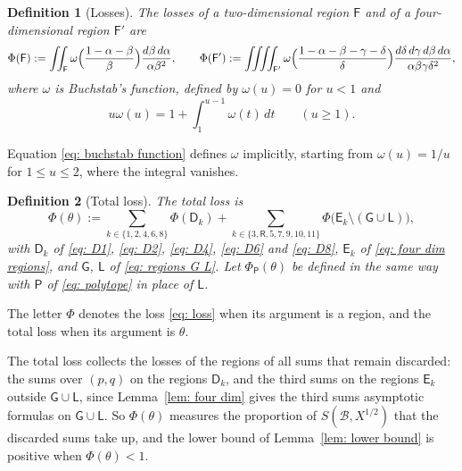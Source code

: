 \documentclass{article}
\numberwithin{equation}{section}
\newtheorem{definition}{Definition}
\newcommand{\Le}{\leqslant}
\newcommand{\Ge}{\geqslant}
\begin{document}
\begin{definition}[Losses]
\label{def: loss}
The \emph{losses} of a two-dimensional region $\mathsf{F}$ and of a four-dimensional region $\mathsf{F}'$ are
\begin{equation}
\label{eq: loss}
\Phi(\mathsf{F}) := \iint_{\mathsf{F}} \omega\Bigl( \frac{1 - \alpha - \beta}{\beta} \Bigr) \frac{d\beta\, d\alpha}{\alpha \beta^2}, \qquad \Phi(\mathsf{F}') := \iiiint_{\mathsf{F}'} \omega\Bigl( \frac{1 - \alpha - \beta - \gamma - \delta}{\delta} \Bigr) \frac{d\delta\, d\gamma\, d\beta\, d\alpha}{\alpha \beta \gamma \delta^2},
\end{equation}
where $\omega$ is \emph{Buchstab's function}, defined by $\omega(u) = 0$ for $u < 1$ and
\begin{equation}
\label{eq: buchstab function}
u\omega(u) = 1 + \int_1^{u-1} \omega(t)\, dt \qquad (u \Ge 1).
\end{equation}
\end{definition}

Equation \eqref{eq: buchstab function} defines $\omega$ implicitly, starting from $\omega(u) = 1/u$ for $1 \Le u \Le 2$, where the integral vanishes.

\begin{definition}[Total loss]
\label{def: total loss}
The \emph{total loss} is
\begin{equation}
\label{eq: total loss}
\Phi(\theta) := \sum_{k \in \{1, 2, 4, 6, 8\}} \Phi(\mathsf{D}_k) + \sum_{k \in \{3, \mathsf{R}, 5, 7, 9, 10, 11\}} \Phi\bigl(\mathsf{E}_k \setminus (\mathsf{G} \cup \mathsf{L})\bigr),
\end{equation}
with $\mathsf{D}_k$ of \eqref{eq: D1}, \eqref{eq: D2}, \eqref{eq: D4}, \eqref{eq: D6} and \eqref{eq: D8}, $\mathsf{E}_k$ of \eqref{eq: four dim regions}, and $\mathsf{G}$, $\mathsf{L}$ of \eqref{eq: regions G L}. Let $\Phi_{\mathsf{P}}(\theta)$ be defined in the same way with $\mathsf{P}$ of \eqref{eq: polytope} in place of $\mathsf{L}$.
\end{definition}

The letter $\Phi$ denotes the loss \eqref{eq: loss} when its argument is a region, and the total loss when its argument is $\theta$.

The total loss collects the losses of the regions of all sums that remain discarded: the sums over $(p, q)$ on the regions $\mathsf{D}_k$, and the third sums on the regions $\mathsf{E}_k$ outside $\mathsf{G} \cup \mathsf{L}$, since Lemma~\ref{lem: four dim} gives the third sums asymptotic formulas on $\mathsf{G} \cup \mathsf{L}$. So $\Phi(\theta)$ measures the proportion of $S(\mathcal{B}, X^{1/2})$ that the discarded sums take up, and the lower bound of Lemma~\ref{lem: lower bound} is positive when $\Phi(\theta) < 1$.
\end{document}
